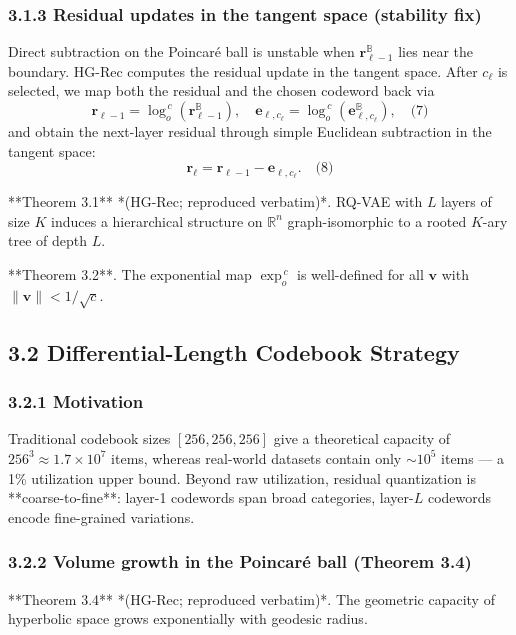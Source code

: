 \documentclass[11pt]{article}
\begin{document}
\subsubsection{3.1.3 Residual updates in the tangent space (stability fix)}

Direct subtraction on the Poincaré ball is unstable when $\mathbf{r}_{\ell-1}^{\mathbb{B}}$ lies near the boundary. HG-Rec computes the residual update in the tangent space. After $c_\ell$ is selected, we map both the residual and the chosen codeword back via
\[\mathbf{r}_{\ell-1} = \log^{\,c}_o(\mathbf{r}_{\ell-1}^{\mathbb{B}}), \quad \mathbf{e}_{\ell, c_\ell} = \log^{\,c}_o(\mathbf{e}^{\mathbb{B}}_{\ell, c_\ell}),\quad\text{(7)}\]
and obtain the next-layer residual through simple Euclidean subtraction in the tangent space:
\[\mathbf{r}_\ell = \mathbf{r}_{\ell-1} - \mathbf{e}_{\ell, c_\ell}.\quad\text{(8)}\]

**Theorem 3.1** *(HG-Rec; reproduced verbatim)*. RQ-VAE with $L$ layers of size $K$ induces a hierarchical structure on $\mathbb{R}^n$ graph-isomorphic to a rooted $K$-ary tree of depth $L$.

**Theorem 3.2**. The exponential map $\exp^{\,c}_o$ is well-defined for all $\mathbf{v}$ with $\|\mathbf{v}\| < 1/\sqrt{c}$.


\subsection{3.2 Differential-Length Codebook Strategy}


\subsubsection{3.2.1 Motivation}

Traditional codebook sizes $[256, 256, 256]$ give a theoretical capacity of $256^3 \approx 1.7 \times 10^7$ items, whereas real-world datasets contain only $\sim 10^5$ items — a 1\% utilization upper bound. Beyond raw utilization, residual quantization is **coarse-to-fine**: layer-1 codewords span broad categories, layer-$L$ codewords encode fine-grained variations.


\subsubsection{3.2.2 Volume growth in the Poincaré ball (Theorem 3.4)}

**Theorem 3.4** *(HG-Rec; reproduced verbatim)*. The geometric capacity of hyperbolic space grows exponentially with geodesic radius.
\end{document}
